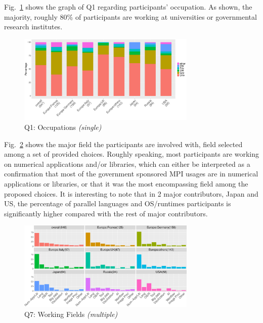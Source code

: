 \documentclass[preprint,5p,times]{elsarticle}
\def\myquote#1{{\it #1}}
\def\mcountries{major contributors\xspace{}}%
\begin{document}
Fig.~\ref{fig:occupations} shows the graph of Q1 regarding participants'
occupation. As shown, the majority, roughly 80\% of participants are working at
universities or governmental research institutes.
%
\begin{figure}[htb]
  \begin{center}
    \includegraphics[width=8.5cm]{R-scripts/Q1.pdf}
    \caption{Q1: Occupations {\it(single)}}
    \label{fig:occupations}
  \end{center}
\end{figure}

Fig.~\ref{fig:working-fields} shows the major field the participants are
involved with, field selected among a set of provided choices.
Roughly speaking, most participants are working on numerical applications and/or
libraries, which can either be interpreted as a confirmation that most of the
government sponsored MPI usages are in numerical applications or libraries, or
that it was the most encompassing field among the proposed choices.
%
It is interesting to note that in 2 \mcountries, Japan and US, the percentage of
parallel languages and OS/runtimes participants is significantly higher compared
with the rest of \mcountries.

\begin{figure}[htb]
  \begin{center}
    \includegraphics[width=8.5cm]{R-scripts/Q7.pdf}
    \caption{Q7: Working Fields {\it(multiple)}}
    \label{fig:working-fields}
  \end{center}
\end{figure}
\end{document}
